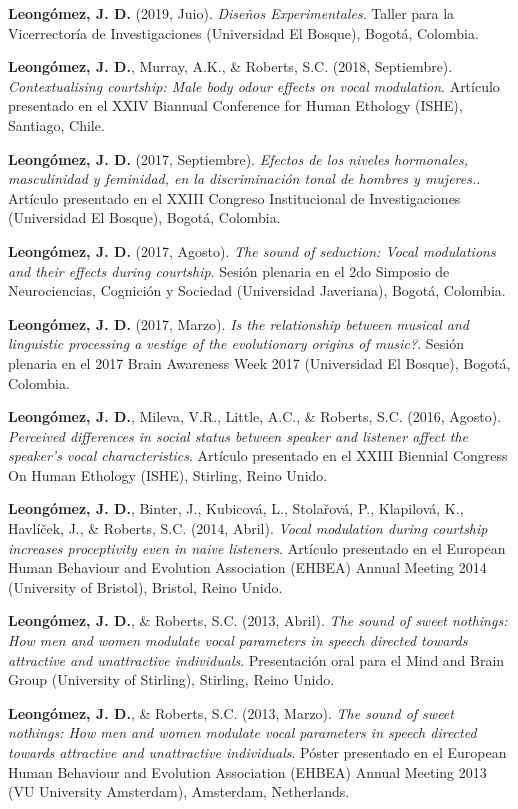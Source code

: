 \documentclass[11pt,a4paper,]{awesome-cv}
\begin{document}
\textbf{Leongómez, J. D.} (2019, Juio). \emph{Diseños Experimentales}.
Taller para la Vicerrectoría de Investigaciones (Universidad El Bosque),
Bogotá, Colombia.

\textbf{Leongómez, J. D.}, Murray, A.K., \& Roberts, S.C. (2018,
Septiembre). \emph{Contextualising courtship: Male body odour effects on
vocal modulation}. Artículo presentado en el XXIV Biannual Conference
for Human Ethology (ISHE), Santiago, Chile.

\textbf{Leongómez, J. D.} (2017, Septiembre). \emph{Efectos de los
niveles hormonales, masculinidad y feminidad, en la discriminación tonal
de hombres y mujeres.}. Artículo presentado en el XXIII Congreso
Institucional de Investigaciones (Universidad El Bosque), Bogotá,
Colombia.

\textbf{Leongómez, J. D.} (2017, Agosto). \emph{The sound of seduction:
Vocal modulations and their effects during courtship}. Sesión plenaria
en el 2do Simposio de Neurociencias, Cognición y Sociedad (Universidad
Javeriana), Bogotá, Colombia.

\textbf{Leongómez, J. D.} (2017, Marzo). \emph{Is the relationship
between musical and linguistic processing a vestige of the evolutionary
origins of music?}. Sesión plenaria en el 2017 Brain Awareness Week 2017
(Universidad El Bosque), Bogotá, Colombia.

\textbf{Leongómez, J. D.}, Mileva, V.R., Little, A.C., \& Roberts, S.C.
(2016, Agosto). \emph{Perceived differences in social status between
speaker and listener affect the speaker's vocal characteristics}.
Artículo presentado en el XXIII Biennial Congress On Human Ethology
(ISHE), Stirling, Reino Unido.

\textbf{Leongómez, J. D.}, Binter, J., Kubicová, L., Stolařová, P.,
Klapilová, K., Havlíček, J., \& Roberts, S.C. (2014, Abril). \emph{Vocal
modulation during courtship increases proceptivity even in naive
listeners}. Artículo presentado en el European Human Behaviour and
Evolution Association (EHBEA) Annual Meeting 2014 (University of
Bristol), Bristol, Reino Unido.

\textbf{Leongómez, J. D.}, \& Roberts, S.C. (2013, Abril). \emph{The
sound of sweet nothings: How men and women modulate vocal parameters in
speech directed towards attractive and unattractive individuals}.
Presentación oral para el Mind and Brain Group (University of Stirling),
Stirling, Reino Unido.

\textbf{Leongómez, J. D.}, \& Roberts, S.C. (2013, Marzo). \emph{The
sound of sweet nothings: How men and women modulate vocal parameters in
speech directed towards attractive and unattractive individuals}. Póster
presentado en el European Human Behaviour and Evolution Association
(EHBEA) Annual Meeting 2013 (VU University Amsterdam), Amsterdam,
Netherlands.
\end{document}
